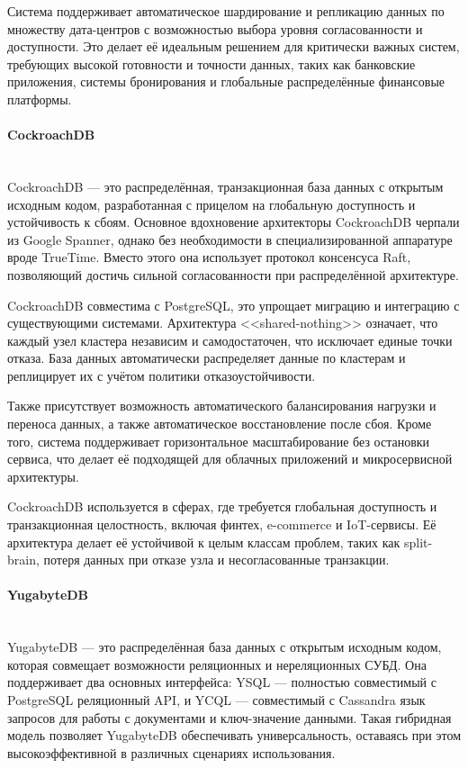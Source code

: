 Система поддерживает автоматическое шардирование и репликацию данных по множеству дата-центров с возможностью выбора уровня согласованности и доступности. Это делает её идеальным решением для критически важных систем, требующих высокой готовности и точности данных, таких как банковские приложения, системы бронирования и глобальные распределённые финансовые платформы.

\paragraph{CockroachDB} ~\\

CockroachDB — это распределённая, транзакционная база данных с открытым исходным кодом, разработанная с прицелом на глобальную доступность и устойчивость к сбоям. Основное вдохновение архитекторы CockroachDB черпали из Google Spanner, однако без необходимости в специализированной аппаратуре вроде TrueTime. Вместо этого она использует протокол консенсуса Raft, позволяющий достичь сильной согласованности при распределённой архитектуре. \autocite{Kleppmann}

CockroachDB совместима с PostgreSQL, это упрощает миграцию и интеграцию с существующими системами. Архитектура <<shared-nothing>> означает, что каждый узел кластера независим и самодостаточен, что исключает единые точки отказа. База данных автоматически распределяет данные по кластерам и реплицирует их с учётом политики отказоустойчивости.

Также присутствует возможность автоматического балансирования нагрузки и переноса данных, а также автоматическое восстановление после сбоя. Кроме того, система поддерживает горизонтальное масштабирование без остановки сервиса, что делает её подходящей для облачных приложений и микросервисной архитектуры.

CockroachDB используется в сферах, где требуется глобальная доступность и транзакционная целостность, включая финтех, e-commerce и IoT-сервисы. Её архитектура делает её устойчивой к целым классам проблем, таких как split-brain, потеря данных при отказе узла и несогласованные транзакции.

\paragraph{YugabyteDB} ~\\

YugabyteDB — это распределённая база данных с открытым исходным кодом, которая совмещает возможности реляционных и нереляционных СУБД. Она поддерживает два основных интерфейса: YSQL — полностью совместимый с PostgreSQL реляционный API, и YCQL — совместимый с Cassandra язык запросов для работы с документами и ключ-значение данными. Такая гибридная модель позволяет YugabyteDB обеспечивать универсальность, оставаясь при этом высокоэффективной в различных сценариях использования.

